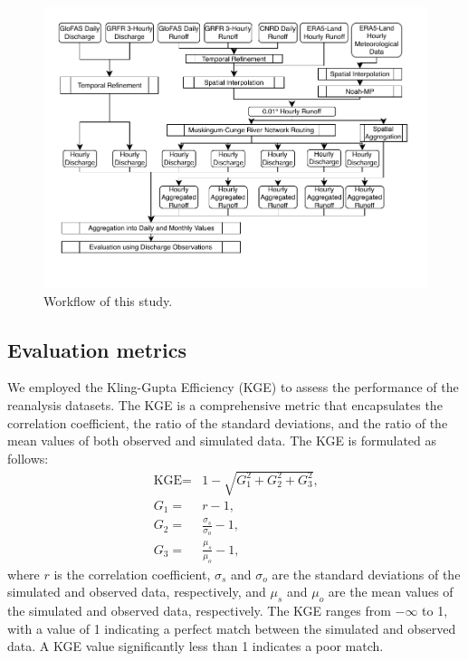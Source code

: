 \documentclass[water,article,submit,pdftex,moreauthors]{Definitions/mdpi}
\begin{document}
\begin{figure}[H]
  \centering
  \includegraphics[width=\textwidth]{workflow.pdf}
  \caption{Workflow of this study.\label{fig:workflow}}
\end{figure}

\subsection{Evaluation metrics}

We employed the Kling-Gupta Efficiency (KGE) \citep{gupta2009JH} to assess the performance of the reanalysis datasets. The KGE is a comprehensive metric that encapsulates the correlation coefficient, the ratio of the standard deviations, and the ratio of the mean values of both observed and simulated data. The KGE is formulated as follows:
\begin{align}
  \label{eq:kge}
  \text{KGE} =& 1 - \sqrt{G_1^2 + G_2^2 + G_3^2} \text{,} \\
  G_1 =& r - 1 \text{,} \\
  G_2 =& \frac{\sigma_s}{\sigma_o} - 1 \text{,} \\
  G_3 =& \frac{\mu_s}{\mu_o} - 1 \text{,}
\end{align}
where $r$ is the correlation coefficient, $\sigma_s$ and $\sigma_o$ are the standard deviations of the simulated and observed data, respectively, and $\mu_s$ and $\mu_o$ are the mean values of the simulated and observed data, respectively. The KGE ranges from $-\infty$ to 1, with a value of 1 indicating a perfect match between the simulated and observed data. A KGE value significantly less than 1 indicates a poor match.
\end{document}
